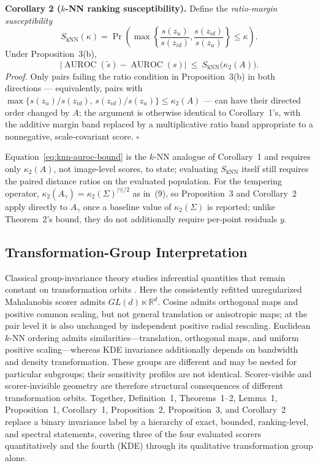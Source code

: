 \documentclass[11pt,a4paper]{article}
\begin{document}
\textbf{Corollary 2 ($k$-NN ranking susceptibility).} Define the \emph{ratio-margin susceptibility}
\begin{equation}
S_{\mathrm{kNN}}(\kappa)=\Pr\!\left(
\max\left\{\frac{s(z_u)}{s(z_{id})},\frac{s(z_{id})}{s(z_u)}\right\}
\le\kappa\right).
\end{equation}
Under Proposition~3(b),
\begin{equation}
\big|\operatorname{AUROC}(\widetilde s)-\operatorname{AUROC}(s)\big|\ \le\ S_{\mathrm{kNN}}\big(\kappa_2(A)\big).
\label{eq:knn-auroc-bound}
\end{equation}
\emph{Proof.} Only pairs failing the ratio condition in Proposition~3(b) in both directions --- equivalently, pairs with $\max\{s(z_u)/s(z_{id}),\,s(z_{id})/s(z_u)\}\le\kappa_2(A)$ --- can have their directed order changed by $A$; the argument is otherwise identical to Corollary~1's, with the additive margin band replaced by a multiplicative ratio band appropriate to a nonnegative, scale-covariant score. \hfill$\square$

Equation~\eqref{eq:knn-auroc-bound} is the $k$-NN analogue of Corollary~1 and requires only $\kappa_2(A)$, not image-level scores, to state; evaluating $S_{\mathrm{kNN}}$ itself still requires the paired distance ratios on the evaluated population. For the tempering operator, $\kappa_2(A_\gamma)=\kappa_2(\Sigma)^{|\gamma|/2}$ as in~(9), so Proposition~3 and Corollary~2 apply directly to $A_\gamma$ once a baseline value of $\kappa_2(\Sigma)$ is reported; unlike Theorem~2's bound, they do not additionally require per-point residuals $y$.

\subsection{Transformation-Group Interpretation}
Classical group-invariance theory studies inferential quantities that remain constant on transformation orbits \cite{b21}. Here the consistently refitted unregularized Mahalanobis scorer admits $GL(d)\ltimes\mathbb{R}^d$. Cosine admits orthogonal maps and positive common scaling, but not general translation or anisotropic maps; at the pair level it is also unchanged by independent positive radial rescaling. Euclidean $k$-NN ordering admits similarities---translation, orthogonal maps, and uniform positive scaling---whereas KDE invariance additionally depends on bandwidth and density transformation. These groups are different and may be nested for particular subgroups; their sensitivity profiles are not identical. Scorer-visible and scorer-invisible geometry are therefore structural consequences of different transformation orbits. Together, Definition~1, Theorems~1--2, Lemma~1, Proposition~1, Corollary~1, Proposition~2, Proposition~3, and Corollary~2 replace a binary invariance label by a hierarchy of exact, bounded, ranking-level, and spectral statements, covering three of the four evaluated scorers quantitatively and the fourth (KDE) through its qualitative transformation group alone.
\end{document}
